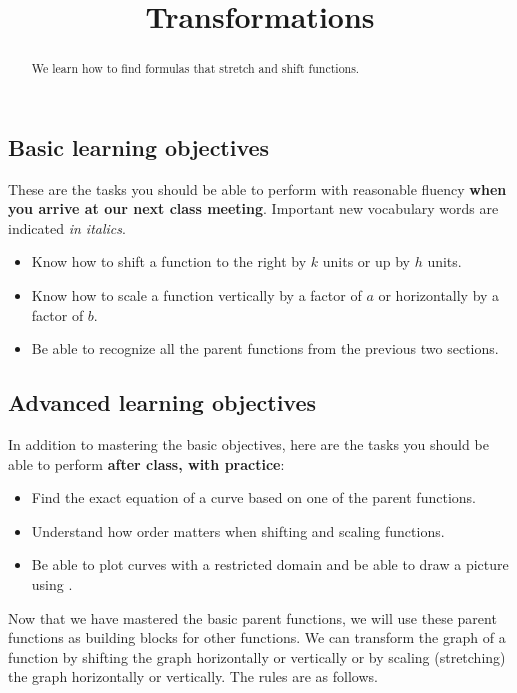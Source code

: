 \documentclass{ximera}
\title{Transformations}
\begin{document}
\begin{abstract}
We learn how to find formulas that stretch and shift functions.
\end{abstract}
\maketitle

\subsection*{Basic learning objectives}

These are the tasks you should be able to perform with reasonable fluency \textbf{when you arrive at our next class meeting}. Important new vocabulary words are indicated \emph{in italics}. 

\begin{itemize}
	\item Know how to shift a function to the right by $k$ units or up by $h$ units.
	\item Know how to scale a function vertically by a factor of $a$ or horizontally by a factor of $b$.
	\item Be able to recognize all the parent functions from the previous two sections.
\end{itemize}

\subsection*{Advanced learning objectives}

In addition to mastering the basic objectives, here are the tasks you should be able to perform \textbf{after class, with practice}: 

\begin{itemize}
	\item Find the exact equation of a curve based on one of the parent functions.
    \item Understand how order matters when shifting and scaling functions.
    \item Be able to plot curves with a restricted domain and be able to draw a picture using .
\end{itemize}

\noindent\hrulefill

Now that we have mastered the basic parent functions, we will use these parent functions as building blocks for other functions. We can transform the graph of a function by shifting the graph horizontally or vertically or by scaling (stretching) the graph horizontally or vertically. The rules are as follows.
\end{document}

